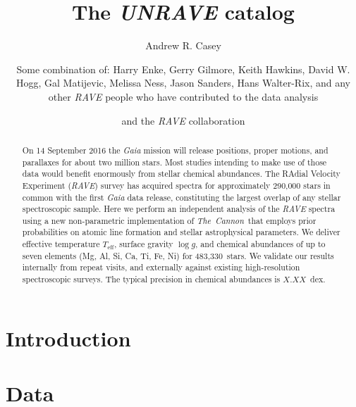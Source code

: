 \documentclass[preprint2,trackchanges]{aastex}
\newcommand{\project}[1]{\textsl{#1}}
\newcommand{\thecannon}{\project{The~Cannon}}
\newcommand{\logg}{\log g}
\newcommand{\teff}{T_{\mathrm{eff}}}
\newcommand{\Nstars}{483,330}
\begin{document}
\title{The \project{UNRAVE} catalog}

\author{Andrew R. Casey}

\author{Some combination of: Harry Enke, Gerry Gilmore, Keith Hawkins, David W. Hogg, Gal Matijevic, Melissa Ness, Jason Sanders, Hans Walter-Rix, and any other  \project{RAVE} people who have contributed to the data analysis}

\author{and the \project{RAVE} collaboration}

\begin{abstract}
On 14 September 2016 the \project{Gaia} mission will release positions, proper motions, and parallaxes for about two million stars.  Most studies intending to make use of those data would benefit enormously from stellar chemical abundances.  The RAdial Velocity Experiment (\project{RAVE}) survey has acquired spectra for approximately 290,000 stars in common with the first \project{Gaia} data release, constituting the largest overlap of any stellar spectroscopic sample.  Here we perform an independent analysis of the \project{RAVE} spectra using a new non-parametric implementation of \thecannon\ that employs prior probabilities on atomic line formation and stellar astrophysical parameters.  We deliver effective temperature $\teff$, surface gravity $\logg$, and chemical abundances of up to seven elements (Mg, Al, Si, Ca, Ti, Fe, Ni) for \Nstars\ stars.  We validate our results internally from repeat visits, and externally against existing high-resolution spectroscopic surveys.  The typical precision in chemical abundances is $X.XX$~dex.  
\end{abstract}

\keywords{}

\section{Introduction} 
\label{sec:introduction}




\section{Data}
\label{sec:data}
\end{document}
